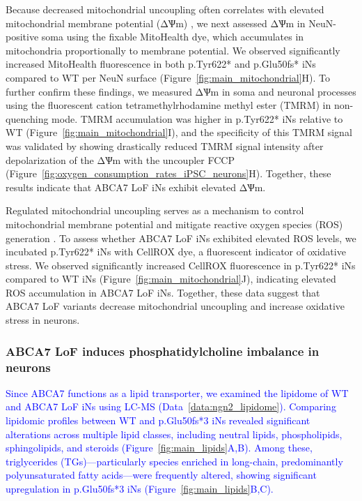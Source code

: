 \documentclass[12pt]{article}
\begin{document}
Because decreased mitochondrial uncoupling often correlates with elevated mitochondrial membrane potential (ΔѰm) \cite{Demine2019-yq,Zorov2021-sj}, we next assessed ΔѰm in NeuN-positive soma using the fixable MitoHealth dye, which accumulates in mitochondria proportionally to membrane potential. We observed significantly increased MitoHealth fluorescence in both p.Tyr622* and p.Glu50fs* iNs compared to WT per NeuN surface (Figure~\ref{fig:main_mitochondrial}H). To further confirm these findings, we measured ΔѰm in soma and neuronal processes using the fluorescent cation tetramethylrhodamine methyl ester (TMRM) in non-quenching mode. TMRM accumulation was higher in p.Tyr622* iNs relative to WT (Figure~\ref{fig:main_mitochondrial}I), and the specificity of this TMRM signal was validated by showing drastically reduced TMRM signal intensity after depolarization of the ΔѰm with the uncoupler FCCP (Figure~\ref{fig:oxygen_consumption_rates_iPSC_neurons}H). Together, these results indicate that ABCA7 LoF iNs exhibit elevated ΔѰm.

Regulated mitochondrial uncoupling serves as a mechanism to control mitochondrial membrane potential and mitigate reactive oxygen species (ROS) generation \cite{Monteiro2021-ei,Demine2019-yq}. To assess whether ABCA7 LoF iNs exhibited elevated ROS levels, we incubated p.Tyr622* iNs with CellROX dye, a fluorescent indicator of oxidative stress. We observed significantly increased CellROX fluorescence in p.Tyr622* iNs compared to WT iNs (Figure~\ref{fig:main_mitochondrial}J), indicating elevated ROS accumulation in ABCA7 LoF iNs. Together, these data suggest that ABCA7 LoF variants decrease mitochondrial uncoupling and increase oxidative stress in neurons.

\subsubsection{ABCA7 LoF induces phosphatidylcholine imbalance in neurons}
\newcommand{\quoteA}{\textcolor{blue}{Since ABCA7 functions as a lipid transporter, we examined the lipidome of WT and ABCA7 LoF iNs using LC-MS (Data~\ref{data:ngn2_lipidome}). Comparing lipidomic profiles between WT and p.Glu50fs*3 iNs revealed significant alterations across multiple lipid classes, including neutral lipids, phospholipids, sphingolipids, and steroids (Figure~\ref{fig:main_lipids}A,B). Among these, triglycerides (TGs)—particularly species enriched in long-chain, predominantly polyunsaturated fatty acids—were frequently altered, showing significant upregulation in p.Glu50fs*3 iNs (Figure~\ref{fig:main_lipids}B,C).\label{quoteA-label}}}
\quoteA
\end{document}
